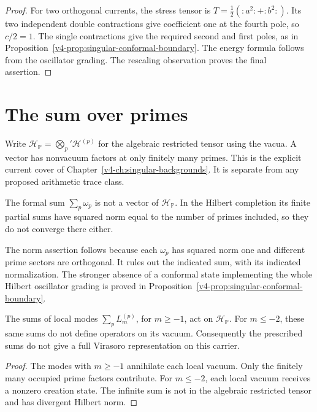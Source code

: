 \begin{proof}
For two orthogonal currents, the stress tensor is
\(T=\tfrac12(:a^2:+:b^2:)\).
Its two independent double contractions give coefficient one
at the fourth pole, so \(c/2=1\).
The single contractions give the required second and first poles,
as in Proposition~\ref{v4-prop:singular-conformal-boundary}.
The energy formula follows from the oscillator grading.
The rescaling observation proves the final assertion.
\end{proof}

\section{The sum over primes}
\label{v4-arith:pol:infinite-tensor-not-VOA}

Write \(\mathcal H_{\mathbb P}=\bigotimes_p'\mathcal H^{(p)}\)
for the algebraic restricted tensor using the vacua.
A vector has nonvacuum factors at only finitely many primes.
This is the explicit current cover of
Chapter~\ref{v4-ch:singular-backgrounds}.
It is separate from any proposed arithmetic trace class.

\begin{observation}\label{v4-arith:obs:infinite-tensor-fails}
The formal sum \(\sum_p\omega_p\) is not a vector of
\(\mathcal H_{\mathbb P}\). In the Hilbert completion its
finite partial sums have squared norm equal to the number
of primes included, so they do not converge there either.
\end{observation}

The norm assertion follows because each \(\omega_p\) has
squared norm one and different prime sectors are orthogonal.
It rules out the indicated sum, with its indicated normalization.
The stronger absence of a conformal state implementing the
whole Hilbert oscillator grading is proved in
Proposition~\ref{v4-prop:singular-conformal-boundary}.

\begin{corollary}\label{v4-arith:cor:no-virasoro}
The sums of local modes \(\sum_pL_m^{(p)}\), for \(m\geq-1\),
act on \(\mathcal H_{\mathbb P}\). For \(m\leq-2\), these
same sums do not define operators on its vacuum.
Consequently the prescribed sums do not give a full
Virasoro representation on this carrier.
\end{corollary}

\begin{proof}
The modes with \(m\geq-1\) annihilate each local vacuum.
Only the finitely many occupied prime factors contribute.
For \(m\leq-2\), each local vacuum receives a nonzero
creation state. The infinite sum is not in the algebraic
restricted tensor and has divergent Hilbert norm.
\end{proof}

